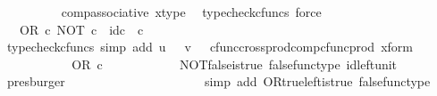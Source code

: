 \begin{isabellebody}
\ \ \ \ \ \ \ \ \isamarkupfalse%
\ comp{\isacharunderscore}{\kern0pt}associative{}\ x{\isacharunderscore}{\kern0pt}type\ \isamarkupfalse%
\ {\isacharparenleft}{\kern0pt}typecheck{\isacharunderscore}{\kern0pt}cfuncs{\isacharcomma}{\kern0pt}\ force{\isacharparenright}{\kern0pt}\isanewline
\ \ \ \ \ \ \isamarkupfalse%
\ \isamarkupfalse%
\ {\isachardoublequoteopen}{\isachardot}{\kern0pt}{\isachardot}{\kern0pt}{\isachardot}{\kern0pt}\ {\isacharequal}{\kern0pt}\ OR\ {\isasymcirc}\isactrlsub c\ {\isasymlangle}NOT\ {\isasymcirc}\isactrlsub c\ {\isasymf}{\isacharcomma}{\kern0pt}\ id\isactrlsub c\ {\isasymOmega}\ {\isasymcirc}\isactrlsub c\ {\isasymf}{\isasymrangle}{\isachardoublequoteclose}\isanewline
\ \ \ \ \ \ \ \ \isamarkupfalse%
\ {\isacharparenleft}{\kern0pt}typecheck{\isacharunderscore}{\kern0pt}cfuncs{\isacharcomma}{\kern0pt}\ simp\ add{\isacharcolon}{\kern0pt}\ {\isacartoucheopen}u\ {\isacharequal}{\kern0pt}\ {\isasymf}{\isacartoucheclose}\ {\isacartoucheopen}v\ {\isacharequal}{\kern0pt}\ {\isasymf}{\isacartoucheclose}\ cfunc{\isacharunderscore}{\kern0pt}cross{\isacharunderscore}{\kern0pt}prod{\isacharunderscore}{\kern0pt}comp{\isacharunderscore}{\kern0pt}cfunc{\isacharunderscore}{\kern0pt}prod\ x{\isacharunderscore}{\kern0pt}form{\isacharparenright}{\kern0pt}\isanewline
\ \ \ \ \ \ \isamarkupfalse%
\ \isamarkupfalse%
\ {\isachardoublequoteopen}{\isachardot}{\kern0pt}{\isachardot}{\kern0pt}{\isachardot}{\kern0pt}\ {\isacharequal}{\kern0pt}\ OR\ {\isasymcirc}\isactrlsub c\ {\isasymlangle}{\isasymt}{\isacharcomma}{\kern0pt}\ {\isasymf}{\isasymrangle}{\isachardoublequoteclose}\isanewline
\ \ \ \ \ \ \ \ \isamarkupfalse%
\ NOT{\isacharunderscore}{\kern0pt}false{\isacharunderscore}{\kern0pt}is{\isacharunderscore}{\kern0pt}true\ false{\isacharunderscore}{\kern0pt}func{\isacharunderscore}{\kern0pt}type\ id{\isacharunderscore}{\kern0pt}left{\isacharunderscore}{\kern0pt}unit{}\ \isamarkupfalse%
\ presburger\isanewline
\ \ \ \ \ \ \isamarkupfalse%
\ \isamarkupfalse%
\ {\isachardoublequoteopen}{\isachardot}{\kern0pt}{\isachardot}{\kern0pt}{\isachardot}{\kern0pt}\ {\isacharequal}{\kern0pt}\ {\isasymt}{\isachardoublequoteclose}\isanewline
\ \ \ \ \ \ \ \ \isamarkupfalse%
\ {\isacharparenleft}{\kern0pt}simp\ add{\isacharcolon}{\kern0pt}\ OR{\isacharunderscore}{\kern0pt}true{\isacharunderscore}{\kern0pt}left{\isacharunderscore}{\kern0pt}is{\isacharunderscore}{\kern0pt}true\ false{\isacharunderscore}{\kern0pt}func{\isacharunderscore}{\kern0pt}type{\isacharparenright}{\kern0pt}\isanewline

\end{isabellebody}
